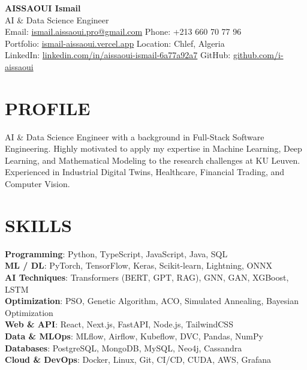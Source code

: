 \documentclass[a4paper,12pt]{article}
\begin{document}
\begin{center}
    {\Huge\bfseries\color{titleblue} AISSAOUI Ismail}\\[4pt]
    {\Large AI \& Data Science Engineer}\\[6pt]

    {\normalsize
    Email: \href{mailto:ismail.aissaoui.pro@gmail.com}{ismail.aissaoui.pro@gmail.com} \quad
    Phone: +213 660 70 77 96 \\
    Portfolio: \href{https://ismail-aissaoui.vercel.app}{ismail-aissaoui.vercel.app} \quad
    Location: Chlef, Algeria \\
    LinkedIn: \href{https://linkedin.com/in/aissaoui-ismail-6a77a92a7}{linkedin.com/in/aissaoui-ismail-6a77a92a7} \quad
    GitHub: \href{https://github.com/i-aissaoui}{github.com/i-aissaoui}
    }
\end{center}

\section{PROFILE}
AI \& Data Science Engineer with a background in Full-Stack Software Engineering. Highly motivated to apply my expertise in Machine Learning, Deep Learning, and Mathematical Modeling to the research challenges at KU Leuven. Experienced in Industrial Digital Twins, Healthcare, Financial Trading, and Computer Vision.

\section{SKILLS}
\textbf{Programming}: Python, TypeScript, JavaScript, Java, SQL \\
\textbf{ML / DL}: PyTorch, TensorFlow, Keras, Scikit-learn, Lightning, ONNX \\
\textbf{AI Techniques}: Transformers (BERT, GPT, RAG), GNN, GAN, XGBoost, LSTM \\
\textbf{Optimization}: PSO, Genetic Algorithm, ACO, Simulated Annealing, Bayesian Optimization \\
\textbf{Web \& API}: React, Next.js, FastAPI, Node.js, TailwindCSS \\
\textbf{Data \& MLOps}: MLflow, Airflow, Kubeflow, DVC, Pandas, NumPy \\
\textbf{Databases}: PostgreSQL, MongoDB, MySQL, Neo4j, Cassandra \\
\textbf{Cloud \& DevOps}: Docker, Linux, Git, CI/CD, CUDA, AWS, Grafana 
\end{document}

